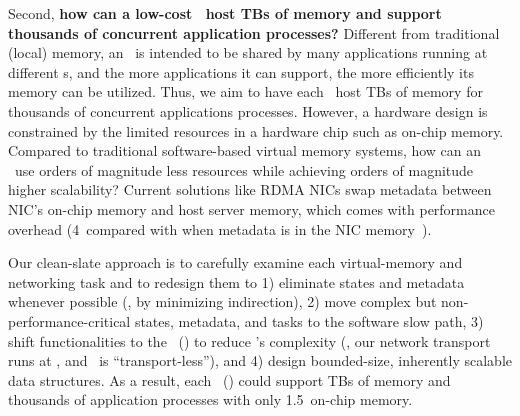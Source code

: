 Second, \textbf{how can a low-cost \MN\ host TBs of memory and support thousands of concurrent application processes?}
Different from traditional (local) memory, an \MN\ is intended to be shared by many applications running at different \CN{}s,
and the more applications it can support, the more efficiently its memory can be utilized.
Thus, we aim to have each \MN\ host TBs of memory for thousands of concurrent applications processes.
However, a hardware design is constrained by the limited resources in a hardware chip such as on-chip memory.
Compared to traditional software-based virtual memory systems, 
how can an \MN\ use orders of magnitude less resources while achieving orders of magnitude higher scalability?
Current solutions like RDMA NICs swap metadata between NIC's on-chip memory and host server memory,
which comes with performance overhead (4\x\ compared with when metadata is in the NIC memory~\cite{Pythia}).

Our clean-slate approach is to carefully examine each virtual-memory and networking task 
and to redesign them to 1) eliminate states and metadata whenever possible (\eg, by minimizing indirection),
2) move complex but non-performance-critical states, metadata, and tasks to the software slow path,
3) shift functionalities to the \CN\ (\syslib) to reduce \MN's complexity 
(\eg, our network transport runs at \syslib, and \MN\ is ``transport-less''),
and 4) design bounded-size, inherently scalable data structures.
As a result, each \MN\ (\sysboard) could support TBs of memory and thousands of application processes with only 1.5\MB\ on-chip memory.

